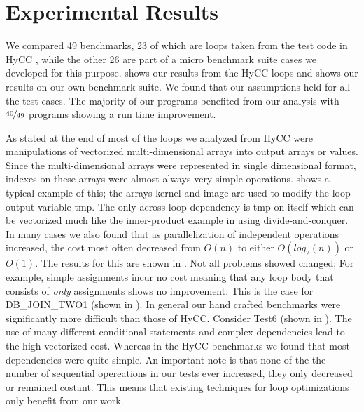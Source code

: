 \section{Experimental Results}
\label{sec:results}





We compared 49 benchmarks, 23 of which are loops taken from
the test code in HyCC \cite{Buscher2018}, while the other 26 are part of a micro benchmark suite cases 
we developed for this purpose.  shows our results from the HyCC loops 
and  shows our results on our own benchmark suite. We found that
our assumptions held for all the test cases. 
The majority of our programs benefited from our analysis with $\nicefrac{40}{49}$ programs showing
a run time improvement. 



As stated at the end of  most of the loops we analyzed from HyCC were manipulations
of vectorized multi-dimensional arrays into output arrays or values. Since the multi-dimensional arrays
were represented in single dimensional format, indexes on these arrays were almost always very simple operations.
 shows a typical example of this; the arrays {\sf kernel} and {\sf image} are used to modify the 
loop output variable {\sf tmp}. The only across-loop dependency
is {\sf tmp} on itself which can be vectorized much like the inner-product example in 
 using divide-and-conquer. In many cases we also found that 
as parallelization of independent operations increased, the cost most often 
decreased from $O(n)$ to either $O(log_{2}(n))$ or $O(1)$. The results
for this are  shown in . Not all problems showed changed;
For example, simple assignments incur no cost meaning that any loop body that consists of 
\emph{only} assignments shows no improvement. This is the case for DB_JOIN_TWO1 (shown in ).
In general our hand crafted benchmarks were significantly more difficult than those of HyCC. 
Consider Test6 (shown in ). The use of many different
conditional statements and complex dependencies lead to the high vectorized cost. 
Whereas in the HyCC benchmarks we found that most dependencies were quite simple.
An important note is that none of the the number of sequential opereations in our tests 
ever increased, they only decreased or remained costant. 
This means that existing techniques for loop optimizations only benefit from our work. 

